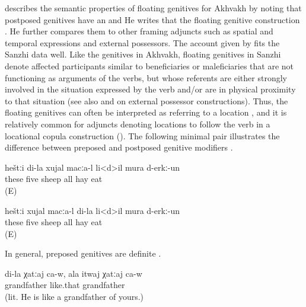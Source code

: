 \citet[346]{Creissels2013} describes the semantic properties of floating genitives for Akhvakh by noting that postposed genitives have an  and  He writes that the floating genitive construction  \citep[333]{Creissels2013}. He further compares them to other framing adjuncts such as spatial and temporal expressions and external possessors. The account given by  fits the Sanzhi data well. Like the genitives in Akhvakh, floating genitives in Sanzhi denote affected participants similar to beneficiaries or maleficiaries that are not functioning as arguments of the verbs, but whose referents are either strongly involved in the situation expressed by the verb and/or are in physical proximity to that situation (see also \citealp{Shibatani1994} and \citealp{Serzhant2016} on external possessor constructions). Thus, the floating genitives can often be interpreted as referring to a location , and it is relatively common for adjuncts denoting locations to follow the verb in a locational copula construction (). The following minimal pair illustrates the difference between preposed and postposed genitive modifiers .
%
\begin{exe}
	\ex	\label{ex:sheep eat hay minimal pair}
	\begin{xlist}
		\ex	\label{ex:‎My five sheep ate all the hay@A}
		\gll	heštːi	di-la	xujal	macːa-l	li<d>il	mura	d-erkː-un\\
			these		five	sheep	all	hay	eat\\
		\glt	{} (E)

		\ex	\label{ex:‎The five sheep of mine ate all the hay}
		\gll	heštːi	xujal	macːa-l	di-la	li<d>il	mura	d-erkː-un\\
			these		five	sheep	 all	hay	eat\\
		\glt	{} (E)
	\end{xlist}
\end{exe}

In general, preposed genitives are definite .
%
\begin{exe}
	\ex	\label{ex:‎(He) is my (real) grandfather. For you he is only an old man extraposed genitive}
	\gll	di-la	χatːaj	ca-w,	ala	itwaj	χatːaj	ca-w\\
			grandfather				like.that	grandfather	\\
	\glt	{} (lit. He is like a grandfather of yours.)
\end{exe}

